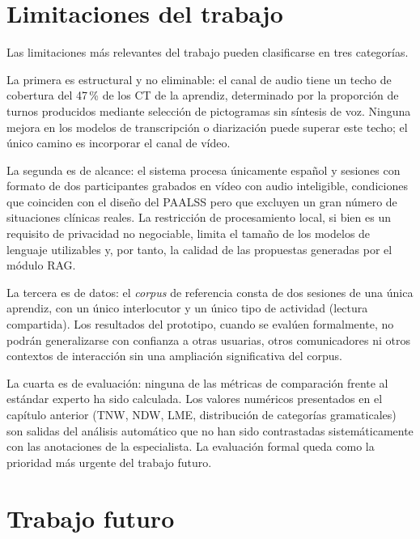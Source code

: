 \section{Limitaciones del trabajo}
\label{sec:conclusiones_limitaciones}

Las limitaciones más relevantes del trabajo pueden clasificarse en tres categorías.

La primera es estructural y no eliminable: el canal de audio tiene un techo de
cobertura del 47\,\% de los \ac{CT} de la aprendiz, determinado por la proporción de
turnos producidos mediante selección de pictogramas sin síntesis de voz. Ninguna
mejora en los modelos de transcripción o diarización puede superar este techo; el
único camino es incorporar el canal de vídeo.

La segunda es de alcance: el sistema procesa únicamente español y sesiones con
formato de dos participantes grabados en vídeo con audio inteligible, condiciones
que coinciden con el diseño del \ac{PAALSS} pero que excluyen un gran número de
situaciones clínicas reales. La restricción de procesamiento local, si bien es un
requisito de privacidad no negociable, limita el tamaño de los modelos de lenguaje
utilizables y, por tanto, la calidad de las propuestas generadas por el módulo \ac{RAG}.

La tercera es de datos: el \emph{corpus} de referencia consta de dos sesiones de una
única aprendiz, con un único interlocutor y un único tipo de actividad (lectura
compartida). Los resultados del prototipo, cuando se evalúen formalmente, no podrán
generalizarse con confianza a otras usuarias, otros comunicadores ni otros contextos
de interacción sin una ampliación significativa del corpus.

La cuarta es de evaluación: ninguna de las métricas de comparación frente al estándar
experto ha sido calculada. Los valores numéricos presentados en el capítulo anterior
(TNW, NDW, \ac{LME}, distribución de categorías gramaticales) son salidas del análisis
automático que no han sido contrastadas sistemáticamente con las anotaciones de la
especialista. La evaluación formal queda como la prioridad más urgente del trabajo futuro.


\section{Trabajo futuro}
\label{sec:conclusiones_futuro}

